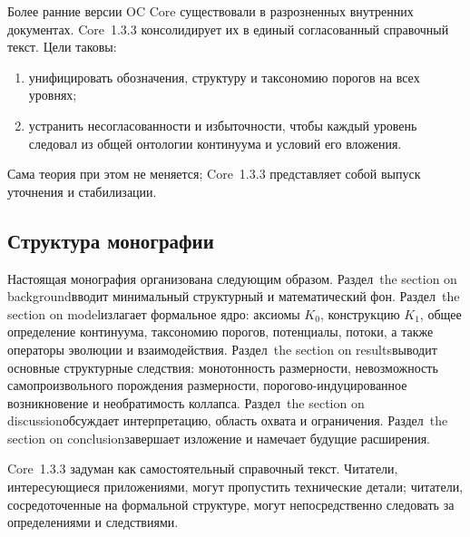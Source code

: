 Более ранние версии OC Core существовали в разрозненных внутренних документах. Core~1.3.3 консолидирует их в единый согласованный справочный текст. Цели таковы:

\begin{enumerate}
    \item унифицировать обозначения, структуру и таксономию порогов на всех уровнях;
    \item устранить несогласованности и избыточности, чтобы каждый уровень следовал из общей онтологии континуума и условий его вложения.
\end{enumerate}

Сама теория при этом не меняется; Core~1.3.3 представляет собой выпуск уточнения и стабилизации.

\subsection{Структура монографии}

Настоящая монография организована следующим образом.  
Раздел~the section on backgroundвводит минимальный структурный и математический фон.  
Раздел~the section on modelизлагает формальное ядро: аксиомы \(K_0\), конструкцию \(K_1\), общее определение континуума, таксономию порогов, потенциалы, потоки, а также операторы эволюции и взаимодействия.  
Раздел~the section on resultsвыводит основные структурные следствия: монотонность размерности, невозможность самопроизвольного порождения размерности, порогово-индуцированное возникновение и необратимость коллапса.  
Раздел~the section on discussionобсуждает интерпретацию, область охвата и ограничения.  
Раздел~the section on conclusionзавершает изложение и намечает будущие расширения.

Core~1.3.3 задуман как самостоятельный справочный текст. Читатели, интересующиеся приложениями, могут пропустить технические детали; читатели, сосредоточенные на формальной структуре, могут непосредственно следовать за определениями и следствиями.
